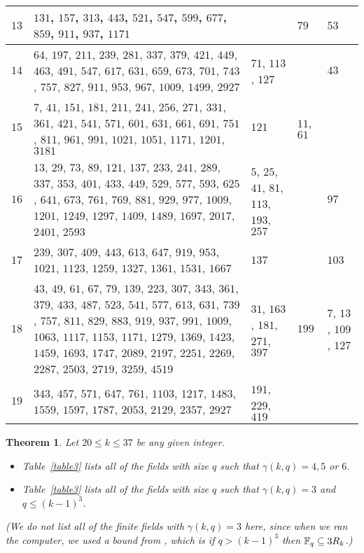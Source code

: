\documentclass[11pt,reqno]{amsart}
\newtheorem{thm}{Theorem}[section]
\begin{document}
\begin{longtable}{ | p{0.5cm} | p{9cm} | p{2.5cm} | p{2.1cm} | p{2.1cm} | }
\hline
$13$ & $131$, $157$, $313$, $443$, $521$, $547$, $599$, $677$, $859$, $911$, $937$, $1171$ & \ \ & $79$ & $53$ \\
\hline
$14$ & $64$, $197$, $211$, $239$, $281$, $337$, $379$, $421$, $449$, $463$, $491$, $547$, $617$, $631$, $659$, $673$, $701$, $743$, $757$, $827$, $911$, $953$, $967$, $1009$, $1499$, $2927$ & $71$, $113$, $127$ & \ \  & $43$  \\
\hline
$15$ & $7$, $41$, $151$, $181$, $211$, $241$, $256$, $271$, $331$, $361$, $421$, $541$, $571$, $601$, $631$, $661$, $691$, $751$, $811$, $961$, $991$, $1021$, $1051$, $1171$, $1201$, $3181$ & $121$ & $11$, $61$ & \ \ \\
\hline
$16$ & $13$, $29$, $73$, $89$, $121$, $137$, $233$, $241$, $289$, $337$, $353$, $401$, $433$, $449$, $529$, $577$, $593$, $625$, $641$, $673$, $761$, $769$, $881$, $929$, $977$, $1009$, $1201$, $1249$, $1297$, $1409$, $1489$, $1697$, $2017$, $2401$, $2593$ & $5$, $25$, $41$, $81$, $113$, $193$, $257$ & \ \ & $97$ \\
\hline
$17$ & $239$, $307$, $409$, $443$, $613$, $647$, $919$, $953$, $1021$, $1123$, $1259$, $1327$, $1361$, $1531$, $1667$ & $137$ & \ \ & $103$ \\
\hline
$18$ & $43$, $49$, $61$, $67$, $79$, $139$, $223$, $307$, $343$, $361$, $379$, $433$, $487$, $523$, $541$, $577$, $613$, $631$, $739$, $757$, $811$, $829$, $883$, $919$, $937$, $991$, $1009$, $1063$, $1117$, $1153$, $1171$, $1279$, $1369$, $1423$, $1459$, $1693$, $1747$, $2089$, $2197$, $2251$, $2269$, $2287$, $2503$, $2719$, $3259$, $4519$ & $31$, $163$, $181$, $271$, $397$ & $199$ & $7$, $13$, $109$, $127$ \\
\hline
$19$ & $343$, $457$, $571$, $647$, $761$, $1103$, $1217$, $1483$, $1559$, $1597$, $1787$, $2053$, $2129$, $2357$, $2927$ & $191$, $229$, $419$ & \ \ & \ \  \\
\hline
\end{longtable}

\begin{thm} \label{table3-thm} 
Let $20 \leqslant k \leqslant 37$ be any given integer. 
\vspace{-0.3cm}
\begin{itemize}
\item Table~\ref{table3} lists all of the fields with size $q$ such that $ \gamma(k,q)=4,5$ or $6$. 
\vspace{-0.3cm}
\item Table~\ref{table3} lists all of the fields with size $q$ such that $ \gamma(k,q)=3$ and $q \leqslant (k-1)^3$.
\end{itemize}
\vspace{-0.3cm}
(We do not list all of the finite fields with $ \gamma(k,q)=3$ here, since when we ran the computer, we used a bound from \cite{Winterhof1}, which is if $q >(k-1)^3$ then $\Bbb F_q \subseteq 3R_{k}$.)
\end{thm}
 
\end{document}

